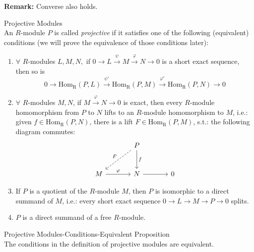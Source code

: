 \noindent\textbf{Remark:} Converse also holds.

\begin{definition}{Projective Modules}\\
An $R$-module $P$ is called \textit{projective} if it satisfies one of the following (equivalent) conditions (we will prove the equivalence of those conditions later):
\begin{enumerate}
    \item $\forall$ $R$-modules $L,M,N,$ if $0 \to L \overset{\psi}{\to} M \overset{\varphi}{\to} N \to 0$ is a short exact sequence, then so is
    $$0 \to \text{Hom}_\text{R} (P,L) \overset{\psi'}{\to} \text{Hom}_\text{R} (P,M) \overset{\varphi'}{\to} \text{Hom}_\text{R} (P,N) \to 0$$

    \item $\forall$ $R$-modules $M,N$, if $M \overset{\varphi}{\to} N\to 0$ is exact, then every $R$-module homomorphism from $P$ to $N$ lifts to an $R$-module homomorphism to $M$, i.e.: given $f\in \text{Hom}_\text{R} (P,N)$, there is a lift $F \in \text{Hom}_\text{R} (P,M)$, s.t.: the following diagram commutes:
    \[
    \begin{tikzcd}[row sep=large, column sep=large]
        & P \arrow[dl, dashed, "F"'] \arrow[d, "f"] & \\
        M \arrow[r, "\varphi"] & N \arrow[r] &0
    \end{tikzcd}
    \]

    \item If $P$ is a quotient of the $R$-module $M$, then $P$ is isomorphic to a direct summand of $M$, i.e.: every short exact sequence $0 \to L \to M \to P \to 0$ splits.
    \item $P$ is a direct summand of a free $R$-module.
\end{enumerate}
\end{definition}

\begin{proposition}{Projective Modules-Conditions-Equivalent Proposition}\\
The conditions in the definition of projective modules are equivalent.
\end{proposition}


